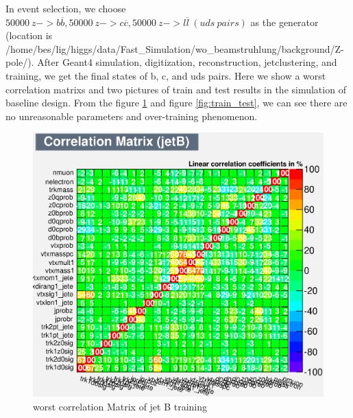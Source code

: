 \documentclass[usetikz]{style/cepcnote}
\begin{document}
In event selection, we choose $50000\ z->b\overline{b}, 50000\ z->c\overline{c}, 50000\ z->l\overline{l}\ (uds\ pairs)$ as the generator (location is /home/bes/lig/higgs/data/Fast\_Simulation/wo\_beamstruhlung/background/Z-pole/). After Geant4 simulation, digitization, reconstruction, jetclustering, and training, we get the final states of b, c, and uds pairs. Here we show a worst correlation matrixs and two pictures of train and test results in the simulation of baseline design. From the figure \ref{fig:cor_mar} and figure \ref{fig:train_test}, we can see there are no unreasonable parameters and over-training phenomenon. 
\begin{figure}[!ht]
	\centering
	\includegraphics[scale=0.5]{figures/CorrelationMatrixjetB_c1.eps}
	\caption{worst correlation Matrix of jet B training}
	\label{fig:cor_mar}
\end{figure}
\end{document}
